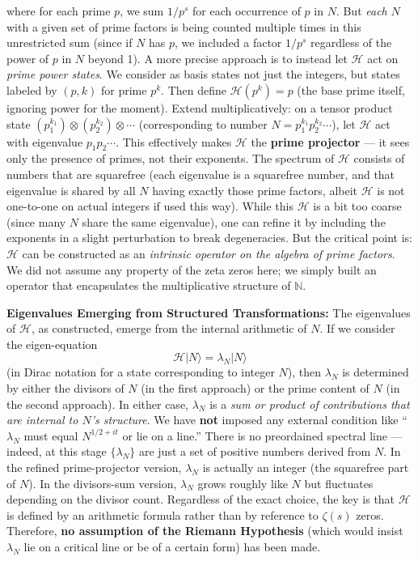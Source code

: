 \documentclass{article}
\begin{document}
where for each prime $p$, we sum $1/p^s$ for each occurrence of $p$ in $N$. But \emph{each} $N$ with a given set of prime factors is being counted multiple times in this unrestricted sum (since if $N$ has $p$, we included a factor $1/p^s$ regardless of the power of $p$ in $N$ beyond 1). A more precise approach is to instead let $\mathcal{H}$ act on \emph{prime power states}. We consider as basis states not just the integers, but states labeled by $(p,k)$ for prime $p^k$. Then define $\mathcal{H}(p^k) = p$ (the base prime itself, ignoring power for the moment). Extend multiplicatively: on a tensor product state $(p_1^{k_1})\otimes (p_2^{k_2}) \otimes \cdots$ (corresponding to number $N = p_1^{k_1}p_2^{k_2}\cdots$), let $\mathcal{H}$ act with eigenvalue $p_1 p_2 \cdots$. This effectively makes $\mathcal{H}$ the \textbf{prime projector} --- it sees only the presence of primes, not their exponents. The spectrum of $\mathcal{H}$ consists of numbers that are squarefree (each eigenvalue is a squarefree number, and that eigenvalue is shared by all $N$ having exactly those prime factors, albeit $\mathcal{H}$ is not one-to-one on actual integers if used this way). While this $\mathcal{H}$ is a bit too coarse (since many $N$ share the same eigenvalue), one can refine it by including the exponents in a slight perturbation to break degeneracies. But the critical point is: $\mathcal{H}$ can be constructed as an \emph{intrinsic operator on the algebra of prime factors}. We did not assume any property of the zeta zeros here; we simply built an operator that encapsulates the multiplicative structure of $\mathbb{N}$.

\medskip

\textbf{Eigenvalues Emerging from Structured Transformations:} The eigenvalues of $\mathcal{H}$, as constructed, emerge from the internal arithmetic of $N$. If we consider the eigen-equation 
$$
\mathcal{H}|N\rangle = \lambda_N |N\rangle
$$
(in Dirac notation for a state corresponding to integer $N$), then $\lambda_N$ is determined by either the divisors of $N$ (in the first approach) or the prime content of $N$ (in the second approach). In either case, $\lambda_N$ is a \emph{sum or product of contributions that are internal to $N$’s structure}. We have \textbf{not} imposed any external condition like “$\lambda_N$ must equal $N^{1/2+it}$ or lie on a line.” There is no preordained spectral line --- indeed, at this stage $\{\lambda_N\}$ are just a set of positive numbers derived from $N$. In the refined prime-projector version, $\lambda_N$ is actually an integer (the squarefree part of $N$). In the divisors-sum version, $\lambda_N$ grows roughly like $N$ but fluctuates depending on the divisor count. Regardless of the exact choice, the key is that $\mathcal{H}$ is defined by an arithmetic formula rather than by reference to $\zeta(s)$ zeros. Therefore, \textbf{no assumption of the Riemann Hypothesis} (which would insist $\lambda_N$ lie on a critical line or be of a certain form) has been made.
\end{document}
